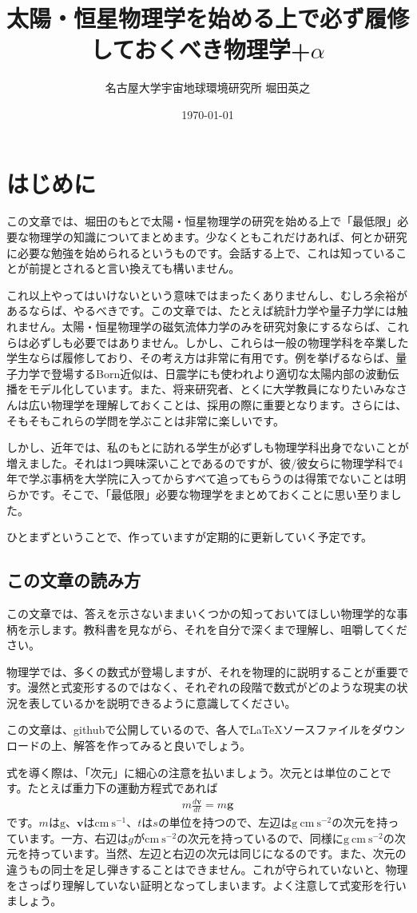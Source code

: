 \documentclass{ltjarticle}
\title{太陽・恒星物理学を始める上で必ず履修しておくべき物理学+$\alpha$}
\author{名古屋大学宇宙地球環境研究所 堀田英之}
\date{\today}
\begin{document}
\maketitle
\tableofcontents
\clearpage
\section{はじめに}
この文章では、堀田のもとで太陽・恒星物理学の研究を始める上で「最低限」必要な物理学の知識についてまとめます。少なくともこれだけあれば、何とか研究に必要な勉強を始められるというものです。会話する上で、これは知っていることが前提とされると言い換えても構いません。\par
これ以上やってはいけないという意味ではまったくありませんし、むしろ余裕があるならば、やるべきです。この文章では、たとえば統計力学や量子力学には触れません。太陽・恒星物理学の磁気流体力学のみを研究対象にするならば、これらは必ずしも必要ではありません。しかし、これらは一般の物理学科を卒業した学生ならば履修しており、その考え方は非常に有用です。例を挙げるならば、量子力学で登場するBorn近似は、日震学にも使われより適切な太陽内部の波動伝播をモデル化しています。また、将来研究者、とくに大学教員になりたいみなさんは広い物理学を理解しておくことは、採用の際に重要となります。さらには、そもそもこれらの学問を学ぶことは非常に楽しいです。
\par
しかし、近年では、私のもとに訪れる学生が必ずしも物理学科出身でないことが増えました。それは1つ興味深いことであるのですが、彼/彼女らに物理学科で4年で学ぶ事柄を大学院に入ってからすべて追ってもらうのは得策でないことは明らかです。そこで、「最低限」必要な物理学をまとめておくことに思い至りました。
\par
ひとまずということで、作っていますが定期的に更新していく予定です。

\subsection{この文章の読み方}
この文章では、答えを示さないままいくつかの知っておいてほしい物理学的な事柄を示します。教科書を見ながら、それを自分で深くまで理解し、咀嚼してください。\par
物理学では、多くの数式が登場しますが、それを物理的に説明することが重要です。漫然と式変形するのではなく、それぞれの段階で数式がどのような現実の状況を表しているかを説明できるように意識してください。\par
この文章は、githubで公開しているので、各人で\LaTeX ソースファイルをダウンロードの上、解答を作ってみると良いでしょう。
\par
式を導く際は、「次元」に細心の注意を払いましょう。次元とは単位のことです。たとえば重力下の運動方程式であれば
\begin{align}
    m\frac{d\bm{v}}{dt} = m \bm{g}
\end{align}
です。$m$は$\mathrm{g}$、$\bm{v}$は$\mathrm{cm~s^{-1}}$、$t$は$s$の単位を持つので、左辺は$\mathrm{g~cm~s^{-2}}$の次元を持っています。一方、右辺は$g$が$\mathrm{cm~s^{-2}}$の次元を持っているので、同様に$\mathrm{g~cm~s^{-2}}$の次元を持っています。当然、左辺と右辺の次元は同じになるのです。また、次元の違うもの同士を足し弾きすることはできません。これが守られていないと、物理をさっぱり理解していない証明となってしまいます。よく注意して式変形を行いましょう。
\end{document}
